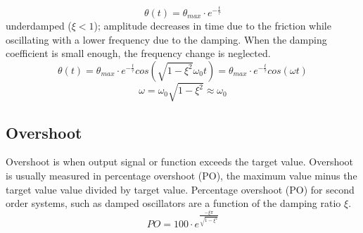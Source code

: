 \documentclass[\main/master.tex]{subfiles}
\begin{document}
\begin{equation}
\theta(t) = \theta_{max}\cdot e^{-\frac{t}{\tau}}     \label{eqn:underdamped_motion_equation}
\end{equation}
 underdamped ($\xi < 1$); amplitude decreases in time due to the friction while oscillating with a lower frequency due to the damping. When the damping coefficient is small enough, the frequency change is neglected.
\begin{equation}
\theta(t) = \theta_{max}\cdot e^{-\frac{t}{\tau}}cos(\sqrt{1-\xi^2}\omega_0 t ) =  \theta_{max}\cdot e^{-\frac{t}{\tau}}cos(\omega t )    \label{eqn:underdamped_motion_equation}
\end{equation}
\begin{equation}
\omega = \omega_0\sqrt{1-\xi^2}\approx\omega_0    \label{eqn:underdamped_frequency}
\end{equation}

\subsection{Overshoot}
Overshoot is when output signal or function exceeds the target value. Overshoot is usually measured in percentage overshoot (PO), the maximum value minus the target value value divided by target value. Percentage overshoot (PO) for second order systems, such as damped oscillators are a function of the damping ratio $\xi$. 
\begin{equation}
PO = 100\cdot e ^{\frac{-\xi\pi}{\sqrt{1-\xi^2}}}   \label{eqn:percentage_overshoot}
\end{equation}



\iffalse
https://ocw.mit.edu/courses/mathematics/18-03sc-differential-equations-fall-2011/unit-ii-second-order-constant-coefficient-linear-equations/damped-harmonic-oscillators/MIT18_03SCF11_s13_2text.pdf

https://www.sciencedirect.com/topics/engineering/underdamped-system#:~:text=When%


\subsection{Driven Oscillator}
If the damped oscillator system is further affected by an external time-dependent tourqe $\tau(t)$,  the system is called driven oscillator.
\begin{equation}
\tau(t) -\kappa\cdot\theta - b\dot{\theta}  = I\cdot\ddot{\theta}   \label{eqn:driven_motion_equation}
\end{equation} 
\begin{equation}
\ddot{\theta} + 2\xi\omega_0\dot{\theta} + \omega_0^2\theta = \frac{\tau(t)}{I}   \label{eqn:damped_motion_equation}
\end{equation}
\fi
\end{document}
